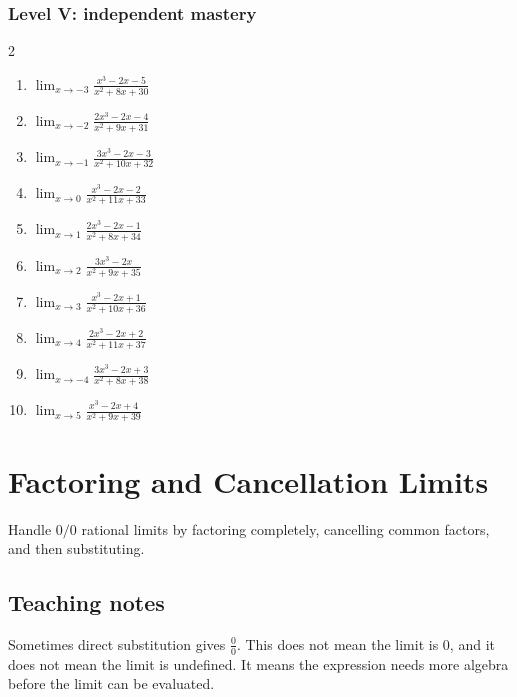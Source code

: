 \documentclass[11pt,oneside]{book}
\newenvironment{rulebox}[1]{\par\medskip\noindent{\color{navy}\bfseries #1}\par\noindent{\color{navy}\hrule}\smallskip}{\par\smallskip\noindent{\color{navy}\hrule}\par\medskip}
\begin{document}
\subsection*{Level V: independent mastery}
\begin{multicols}{2}
\begin{enumerate}[leftmargin=*,label=\textbf{\arabic*.},itemsep=0.65\baselineskip]
\item $\displaystyle \lim_{x \to -3} \frac{x^{3} - 2 x - 5}{x^{2} + 8 x + 30}$
\item $\displaystyle \lim_{x \to -2} \frac{2 x^{3} - 2 x - 4}{x^{2} + 9 x + 31}$
\item $\displaystyle \lim_{x \to -1} \frac{3 x^{3} - 2 x - 3}{x^{2} + 10 x + 32}$
\item $\displaystyle \lim_{x \to 0} \frac{x^{3} - 2 x - 2}{x^{2} + 11 x + 33}$
\item $\displaystyle \lim_{x \to 1} \frac{2 x^{3} - 2 x - 1}{x^{2} + 8 x + 34}$
\item $\displaystyle \lim_{x \to 2} \frac{3 x^{3} - 2 x}{x^{2} + 9 x + 35}$
\item $\displaystyle \lim_{x \to 3} \frac{x^{3} - 2 x + 1}{x^{2} + 10 x + 36}$
\item $\displaystyle \lim_{x \to 4} \frac{2 x^{3} - 2 x + 2}{x^{2} + 11 x + 37}$
\item $\displaystyle \lim_{x \to -4} \frac{3 x^{3} - 2 x + 3}{x^{2} + 8 x + 38}$
\item $\displaystyle \lim_{x \to 5} \frac{x^{3} - 2 x + 4}{x^{2} + 9 x + 39}$
\end{enumerate}
\end{multicols}

\chapter{Factoring and Cancellation Limits}
\begin{rulebox}{Learning target}
Handle $0/0$ rational limits by factoring completely, cancelling common factors, and then substituting.
\end{rulebox}
\section*{Teaching notes}
Sometimes direct substitution gives $\frac{0}{0}$. This does not mean the limit is $0$, and it does not mean the limit is undefined. It means the expression needs more algebra before the limit can be evaluated.
\end{document}
